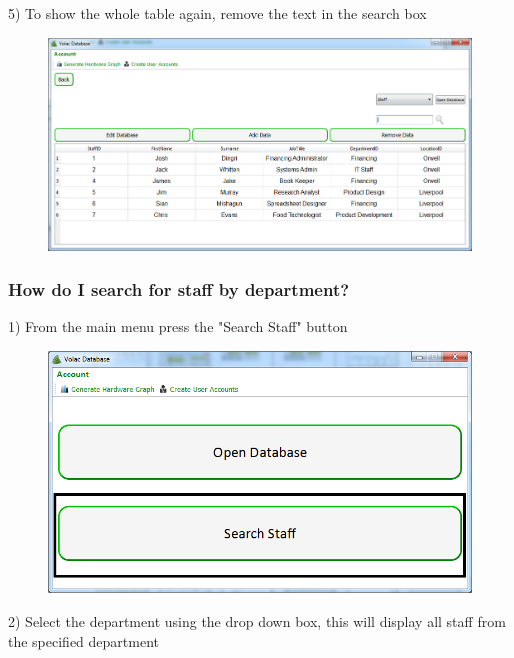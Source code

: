5) To show the whole table again, remove the text in the search box

\begin{figure}[H]
    \includegraphics[width=\textwidth]{./Manual/Images/search2.png}
\end{figure}


\subsubsection{How do I search for staff by department?}

1) From the main menu press the "Search Staff" button

\begin{figure}[H]
    \includegraphics[width=\textwidth]{./Manual/Images/searchdep.png}
\end{figure}

2) Select the department using the drop down box, this will display all staff from the specified department

